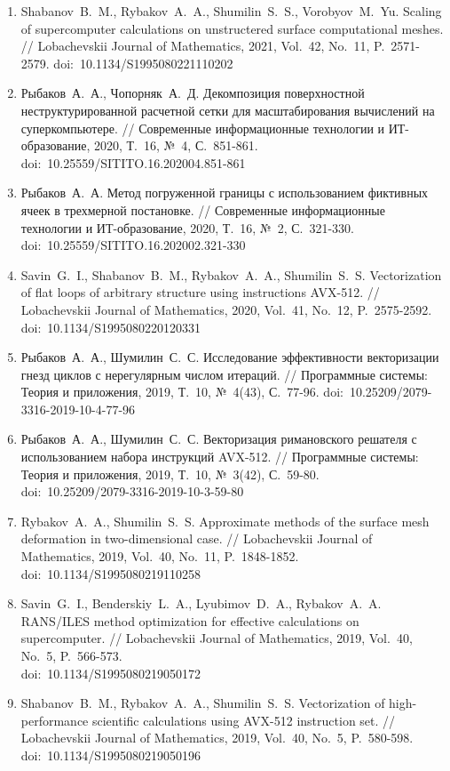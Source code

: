 \documentclass[a4paper,14pt]{extarticle}                     %
\theoremstyle{plain}                                         %
\begin{document}
\begin{enumerate}[noitemsep,topsep=0pt,parsep=0pt,partopsep=0pt]
\item Shabanov~B.~M., Rybakov~A.~A., Shumilin~S.~S., Vorobyov~M.~Yu. Scaling of supercomputer calculations on unstructered surface computational meshes. // Lobachevskii Journal of Mathematics, 2021, Vol.~42, No.~11, P.~2571-2579. doi:~10.1134/S1995080221110202
\item Рыбаков~А.~А., Чопорняк~А.~Д. Декомпозиция поверхностной неструктурированной расчетной сетки для масштабирования вычислений на суперкомпьютере. // Современные информационные технологии и ИТ-образование, 2020, Т.~16, №~4, С.~851-861. \\ doi:~10.25559/SITITO.16.202004.851-861
\item Рыбаков~А.~А. Метод погруженной границы с использованием фиктивных ячеек в трехмерной постановке. // Современные информационные технологии и ИТ-образование, 2020, Т.~16, №~2, С.~321-330. \\ doi:~10.25559/SITITO.16.202002.321-330
\item Savin~G.~I., Shabanov~B.~M., Rybakov~A.~A., Shumilin~S.~S. Vectorization of flat loops of arbitrary structure using instructions AVX-512. // Lobachevskii Journal of Mathematics, 2020, Vol.~41, No.~12, P.~2575-2592. \\ doi:~10.1134/S1995080220120331
\item Рыбаков~А.~А., Шумилин~С.~С. Исследование эффективности векторизации гнезд циклов с нерегулярным числом итераций. // Программные системы: Теория и приложения, 2019, Т.~10, №~4(43), С.~77-96. doi:~10.25209/2079-3316-2019-10-4-77-96
\item Рыбаков~А.~А., Шумилин~С.~С. Векторизация римановского решателя с использованием набора инструкций AVX-512. // Программные системы: Теория и приложения, 2019, Т.~10, №~3(42), С.~59-80. \\ doi:~10.25209/2079-3316-2019-10-3-59-80
\item Rybakov~A.~A., Shumilin~S.~S. Approximate methods of the surface mesh deformation in two-dimensional case. // Lobachevskii Journal of Mathem\-atics, 2019, Vol.~40, No.~11, P.~1848-1852. doi:~10.1134/S1995080219110258
\item Savin~G.~I., Benderskiy~L.~A., Lyubimov~D.~A., Rybakov~A.~A. RANS/ILES method optimization for effective calculations on supercomputer. // Loba\-chevskii Journal of Mathematics, 2019, Vol.~40, No.~5, P.~566-573. \\ doi:~10.1134/S1995080219050172
\item Shabanov~B.~M., Rybakov~A.~A., Shumilin~S.~S. Vectorization of high-performance scientific calculations using AVX-512 instruction set. // Loba\-chevskii Journal of Mathematics, 2019, Vol.~40, No.~5, P.~580-598. \\ doi:~10.1134/S1995080219050196

\end{enumerate}
\end{document}
